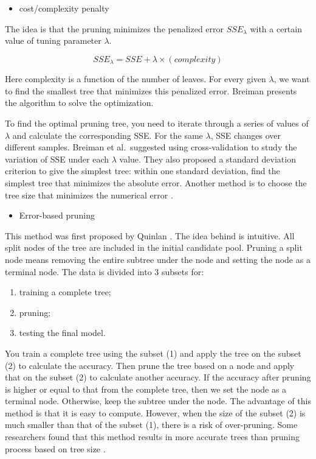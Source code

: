 \documentclass[12pt,]{krantz}
\providecommand{\tightlist}{%
  \setlength{\itemsep}{0pt}\setlength{\parskip}{0pt}}
\begin{document}
\begin{itemize}
\tightlist
\item
  cost/complexity penalty
\end{itemize}

The idea is that the pruning minimizes the penalized error \(SSE_{\lambda}\) with a certain value of tuning parameter \(\lambda\).

\[SSE_{\lambda} = SSE+\lambda \times (complexity)\]

Here complexity is a function of the number of leaves. For every given \(\lambda\), we want to find the smallest tree that minimizes this penalized error. Breiman presents the algorithm to solve the optimization\citep{Breiman1984}.

To find the optimal pruning tree, you need to iterate through a series of values of \(\lambda\) and calculate the corresponding SSE. For the same \(\lambda\), SSE changes over different samples. Breiman et al.~suggested using cross-validation \citep{Breiman1984} to study the variation of SSE under each \(\lambda\) value. They also proposed a standard deviation criterion to give the simplest tree: within one standard deviation, find the simplest tree that minimizes the absolute error. Another method is to choose the tree size that minimizes the numerical error \citep{Hastie2008}.

\begin{itemize}
\tightlist
\item
  Error-based pruning
\end{itemize}

This method was first proposed by Quinlan \citep{Quinlan1999}. The idea behind is intuitive. All split nodes of the tree are included in the initial candidate pool. Pruning a split node means removing the entire subtree under the node and setting the node as a terminal node. The data is divided into 3 subsets for:

\begin{enumerate}
\def\labelenumi{(\arabic{enumi})}
\item
  training a complete tree;
\item
  pruning;
\item
  testing the final model.
\end{enumerate}

You train a complete tree using the subset (1) and apply the tree on the subset (2) to calculate the accuracy. Then prune the tree based on a node and apply that on the subset (2) to calculate another accuracy. If the accuracy after pruning is higher or equal to that from the complete tree, then we set the node as a terminal node. Otherwise, keep the subtree under the node. The advantage of this method is that it is easy to compute. However, when the size of the subset (2) is much smaller than that of the subset (1), there is a risk of over-pruning. Some researchers found that this method results in more accurate trees than pruning process based on tree size \citep{Espoito1997}.
\end{document}
